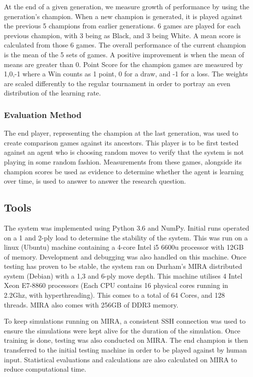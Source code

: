 \documentclass[12pt,a4paper]{article}
\begin{document}
        At the end of a given generation, we measure growth of performance by using the generation's champion. When a new champion is generated, it is played against the previous 5 champions from earlier generations. 6 games are played for each previous champion, with 3 being as Black, and 3 being White. A mean score is calculated from those 6 games. The overall performance of the current champion is the mean of the 5 sets of games. A positive improvement is when the mean of means are greater than 0. Point Score for the champion games are measured by {1,0,-1} where a Win counts as 1 point, 0 for a draw, and -1 for a loss. The weights are scaled differently to the regular tournament in order to portray an even distribution of the learning rate.
    
        \subsubsection*{Evaluation Method}
    
        The end player, representing the champion at the last generation, was used to create comparison games against its ancestors. This player is to be first tested against an agent who is choosing random moves to verify that the system is not playing in some random fashion. Measurements from these games, alongside its champion scores be used as evidence to determine whether the agent is learning over time, is used to answer to answer the research question.
       
    \subsection{Tools}
        The system was implemented using Python 3.6 and NumPy. Initial runs operated on a 1 and 2-ply load to determine the stability of the system. This was run on a linux (Ubuntu) machine containing a 4-core Intel i5 6600u processor with 12GB of memory. Development and debugging was also handled on this machine. Once testing has proven to be stable, the system ran on Durham's MIRA distributed system (Debian) with a 1,3 and 6-ply move depth. This machine utilises 4 Intel Xeon E7-8860 processors (Each CPU contains 16 physical cores running in 2.2Ghz, with hyperthreading). This comes to a total of 64 Cores, and 128 threads. MIRA also comes with 256GB of DDR3 memory. 
        
        To keep simulations running on MIRA, a consistent SSH connection was used to ensure the simulations were kept alive for the duration of the simulation. Once training is done, testing was also conducted on MIRA. The end champion is then transferred to the initial testing machine in order to be played against by human input. Statistical evaluations and calculations are also calculated on MIRA to reduce computational time.
\end{document}
